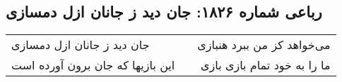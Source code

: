 \begin{center}
\section*{رباعی شماره ۱۸۲۶: جان دید ز جانان ازل دمسازی}
\label{sec:1826}
\begin{longtable}{l p{0.5cm} r}
جان دید ز جانان ازل دمسازی
&&
می‌خواهد کز من ببرد هنبازی
\\
این بازیها که جان برون آورده است
&&
ما را به خود تمام بازی بازی
\\
\end{longtable}
\end{center}
